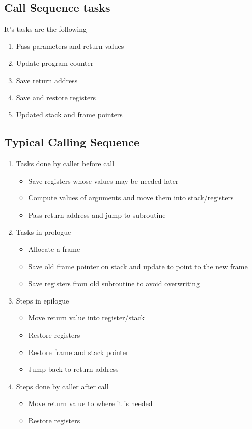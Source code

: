 \documentclass{article}
\begin{document}
\subsection{Call Sequence tasks}
It's tasks are the following
\begin{enumerate}
  \item Pass parameters and return values
  \item Update program counter
  \item Save return address
  \item Save and restore registers
  \item Updated stack and frame pointers
\end{enumerate}
\subsection{Typical Calling Sequence}
\begin{enumerate}
  \item Tasks done by caller before call
  \begin{itemize}
    \item Save registers whose values may be needed later
    \item Compute values of arguments and move them into stack/registers
    \item Pass return address and jump to subroutine
  \end{itemize}
  \item Tasks in prologue
  \begin{itemize}
    \item Allocate a frame
    \item Save old frame pointer on stack and update to point to the new frame
    \item Save registers from old subroutine to avoid overwriting
  \end{itemize}
  \item Steps in epilogue
  \begin{itemize}
    \item Move return value into register/stack
    \item Restore registers
    \item Restore frame and stack pointer
    \item Jump back to return address
  \end{itemize}
  \item Steps done by caller after call
  \begin{itemize}
    \item Move return value to where it is needed
    \item Restore registers
  \end{itemize}
\end{enumerate}
\end{document}
